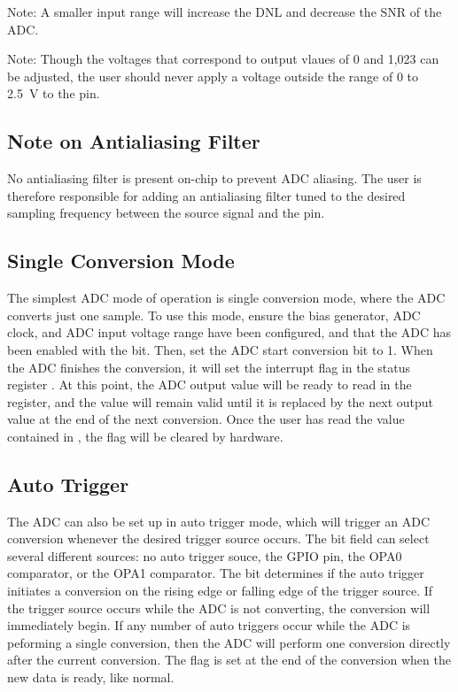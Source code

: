 Note: A smaller input range will increase the DNL and decrease the SNR of the ADC.

Note: Though the voltages that correspond to output vlaues of 0 and 1,023 can be adjusted, the user should never apply a voltage outside the range of 0 to 2.5~\si{\volt} to the  pin.



\subsection{Note on Antialiasing Filter}

No antialiasing filter is present on-chip to prevent ADC aliasing. The user is therefore responsible for adding an antialiasing filter tuned to the desired sampling frequency between the source signal and the  pin.



\subsection{Single Conversion Mode}

The simplest ADC mode of operation is single conversion mode, where the ADC converts just one sample. To use this mode, ensure the bias generator, ADC clock, and ADC input voltage range have been configured, and that the ADC has been enabled with the  bit. Then, set the ADC start conversion bit  to 1. When the ADC finishes the conversion, it will set the  interrupt flag in the status register . At this point, the ADC output value will be ready to read in the  register, and the value will remain valid until it is replaced by the next output value at the end of the next conversion. Once the user has read the value contained in , the  flag will be cleared by hardware.



\subsection{Auto Trigger}

The ADC can also be set up in auto trigger mode, which will trigger an ADC conversion whenever the desired trigger source occurs. The  bit field can select several different sources: no auto trigger souce, the  GPIO pin, the OPA0 comparator, or the OPA1 comparator. The  bit determines if the auto trigger initiates a conversion on the rising edge or falling edge of the trigger source. If the trigger source occurs while the ADC is not converting, the conversion will immediately begin. If any number of auto triggers occur while the ADC is peforming a single conversion, then the ADC will perform one conversion directly after the current conversion. The  flag is set at the end of the conversion when the new data is ready, like normal.



